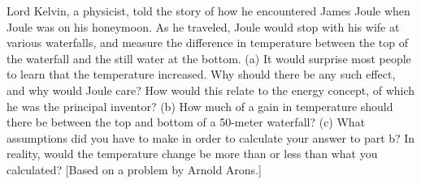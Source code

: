 \answercheck Lord Kelvin, a physicist, told the story of how he
encountered James Joule when Joule was on his honeymoon. As
he traveled, Joule would stop with his wife at various
waterfalls, and measure the difference in temperature
between the top of the waterfall and the still water at the
bottom. (a) It would surprise most people to learn that the
temperature increased. Why should there be any such effect,
and why would Joule care? How would this relate to the
energy concept, of which he was the principal inventor? (b)
How much of a gain in temperature should there be between
the top and bottom of a 50-meter waterfall? (c) What
assumptions did you have to make in order to calculate your
answer to part b? In reality, would the temperature change
be more than or less than what you calculated? [Based on a
problem by Arnold Arons.]

